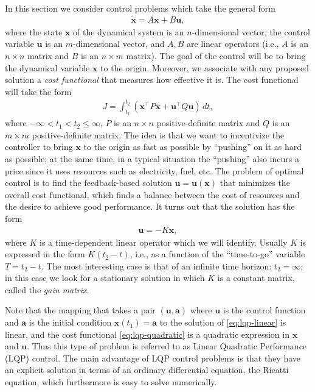 \documentclass[12pt]{amsart}
\newcommand{\eq}[1]{\begin{equation}\begin{split}#1\end{split}\end{equation}}
\begin{document}
In this section we consider control problems which take the general form
\eq{ \label{eq:lqp-linear}
\dot{\mathbf{x}} = A \mathbf{x} + B \mathbf{u},
}
where the state $\mathbf{x}$ of the dynamical system is an $n$-dimensional vector, the control variable $\mathbf{u}$ is an $m$-dimensional vector, and $A, B$ are linear operators (i.e., $A$ is an $n\times n$ matrix and $B$ is an $n\times m$ matrix). The goal of the control will be to bring the dynamical variable $\mathbf{x}$ to the origin. Moreover, we associate with any proposed solution a \emph{cost functional} that measures how effective it is. The cost functional will take the form
\eq{ \label{eq:lqp-quadratic}
J = \int_{t_1}^{t_2}
\left( \mathbf{x}^\top P \mathbf{x} + \mathbf{u}^\top Q \mathbf{u} \right)\, dt,
}
where $-\infty<t_1<t_2\le \infty$, $P$ is an $n\times n$ positive-definite matrix and $Q$ is an $m\times m$ positive-definite matrix. The idea is that we want to incentivize the controller to bring $\mathbf{x}$ to the origin as fast as possible by ``pushing'' on it as hard as possible; at the same time, in a typical situation the ``pushing'' also incurs a price since it uses resources  such as electricity, fuel, etc. The problem of optimal control is to find the feedback-based solution $\mathbf{u}=\mathbf{u}(\mathbf{x})$ that minimizes the overall cost functional, which finds a balance between the cost of resources and the desire to achieve good performance. It turns out that the solution has the form
\eq{ \label{eq:lqp-gain-mat}
\mathbf{u} = -K \mathbf{x},
}
where $K$ is a time-dependent linear operator which we will identify. Usually $K$ is expressed in the form $K(t_2-t)$, i.e., as a function of the ``time-to-go'' variable $T=t_2-t$. The most interesting case is that of an infinite time horizon: $t_2=\infty$; in this case we look for a stationary solution in which $K$ is a constant matrix, called the \emph{gain matrix}.

Note that the mapping that takes a pair $(\mathbf{u},\mathbf{a})$ where $\mathbf{u}$ is the control function and $\mathbf{a}$ is the initial condition $\mathbf{x}(t_1)=\mathbf{a}$ to the solution of \eqref{eq:lqp-linear} is linear, and the cost functional \eqref{eq:lqp-quadratic} is a quadratic expression in $\mathbf{x}$ and $\mathbf{u}$. Thus this type of problem is referred to as Linear Quadratic Performance (LQP) control. The main advantage of LQP control problems is that they have an explicit solution in terms of an ordinary differential equation, the Ricatti equation, which furthermore is easy to solve numerically.
\end{document}
